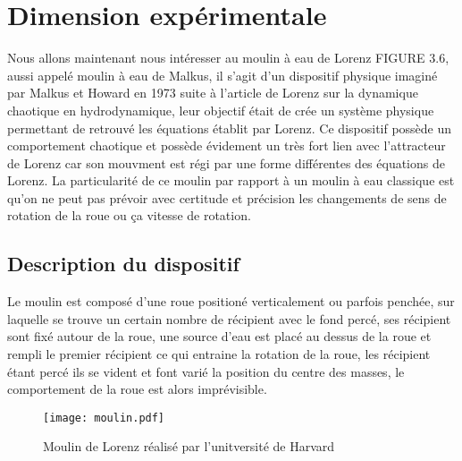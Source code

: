 \section{Dimension expérimentale}

Nous allons maintenant nous intéresser au moulin à eau de Lorenz FIGURE 3.6, aussi appelé moulin à eau de Malkus, il s'agit d'un dispositif physique imaginé par Malkus et Howard en 1973 suite à l'article de
Lorenz sur la dynamique chaotique en hydrodynamique, leur objectif était de crée un système physique permettant de retrouvé les équations établit par Lorenz. Ce dispositif possède un comportement chaotique et possède évidement un très fort lien avec l'attracteur de Lorenz car son mouvment est régi par une forme différentes des équations de Lorenz. La particularité de ce moulin par rapport à un moulin à eau classique est qu'on ne peut pas prévoir avec certitude et précision les changements de sens de rotation de la roue ou ça vitesse de rotation.

\subsection{Description du dispositif}

Le moulin est composé d'une roue positioné verticalement ou parfois penchée, sur laquelle se trouve un certain nombre de récipient avec le fond percé, ses récipient sont fixé autour de la roue, une source d'eau est placé au dessus de la roue et rempli le premier récipient ce qui entraine la rotation de la roue, les récipient étant percé ils se vident et font varié la position du centre des masses, le comportement de la roue est alors imprévisible.

\begin{figure}
    \texttt{[image: moulin.pdf]}
    \caption{Moulin de Lorenz réalisé par l'unitversité de Harvard} 
\end{figure}

